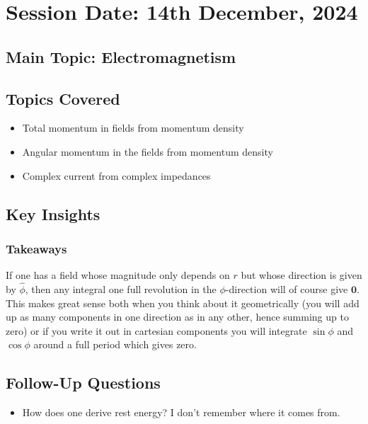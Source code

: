 \section{Session Date: 14th December, 2024}
\subsection*{Main Topic: Electromagnetism}
\subsection*{Topics Covered}
\begin{itemize}
    \item Total momentum in fields from momentum density
    \item Angular momentum in the fields from momentum density
    \item Complex current from complex impedances
\end{itemize}

\subsection*{Key Insights}
\subsubsection*{Takeaways}
If one has a field whose magnitude only depends on \(r\) but whose direction is given by \(\hat{\phi}\), then any integral one full revolution in the \(\phi \)-direction will of course give \(\mathbf{0}\). This makes great sense both when you think about it geometrically (you will add up as many components in one direction as in any other, hence summing up to zero) or if you write it out in cartesian components you will integrate \(\sin \phi \) and \(\cos \phi \) around a full period which gives zero.

\subsection*{Follow-Up Questions}
\begin{itemize}
    \item How does one derive rest energy? I don't remember where it comes from.
\end{itemize}
